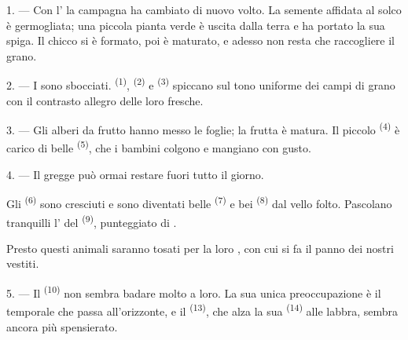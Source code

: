 
\VUsaut{5.0mm}
\VUsaut{3.0mm}
\VUsaut{3.0mm}
\VUsaut{4.0mm}
\VUsaut{3.0mm}

1. --- Con l' la campagna ha cambiato di nuovo volto. La semente
affidata al solco è germogliata; una piccola pianta verde è uscita dalla terra e ha
portato la sua spiga. Il chicco si è formato, poi è maturato, e adesso non resta che
raccogliere il grano.

2. --- I  sono sbocciati. 
\textsuperscript{(1)},  \textsuperscript{(2)} e
 \textsuperscript{(3)} spiccano sul tono uniforme dei campi di grano
con il contrasto allegro delle loro  fresche.

3. --- Gli alberi da frutto hanno messo le foglie; la frutta è matura. Il piccolo
 \textsuperscript{(4)} è carico di belle 
\textsuperscript{(5)}, che i bambini colgono e mangiano con gusto.

4. --- Il gregge può ormai restare fuori tutto il giorno.

Gli  \textsuperscript{(6)} sono cresciuti e sono diventati belle
 \textsuperscript{(7)} e bei  \textsuperscript{(8)} dal
vello folto. Pascolano tranquilli l' del 
\textsuperscript{(9)}, punteggiato di .

Presto questi animali saranno tosati per la loro , con cui si fa il panno
dei nostri vestiti.

\VUsaut{5.0mm}
\VUsaut{3.4mm}

5. --- Il  \textsuperscript{(10)} non sembra badare molto a loro. La
sua unica preoccupazione è il temporale che passa all'orizzonte, e il 
\textsuperscript{(13)}, che alza la sua  \textsuperscript{(14)} alle
labbra, sembra ancora più spensierato.

